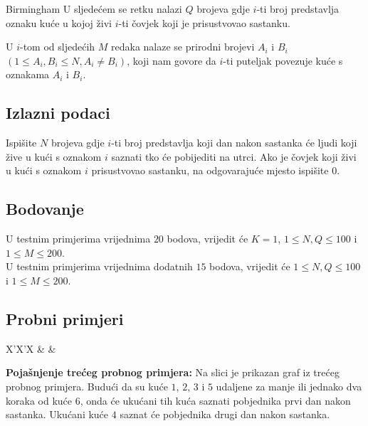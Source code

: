 \begin{statement}[
  problempoints=70,
  timelimit=1 sekunda,
  memorylimit=512 MiB,
]{Birmingham}
U sljedećem se retku nalazi $Q$ brojeva gdje $i$-ti broj predstavlja oznaku
kuće u kojoj živi $i$-ti čovjek koji je prisustvovao sastanku.

U $i$-tom od sljedećih $M$ redaka nalaze se prirodni brojevi $A_i$ i $B_i$ $(1
\le A_i, B_i \le N, A_i \neq B_i)$, koji nam govore da $i$-ti puteljak
povezuje kuće s oznakama $A_i$ i $B_i$.

\subsection*{Izlazni podaci}
Ispišite $N$ brojeva gdje $i$-ti broj predstavlja koji dan nakon sastanka će
ljudi koji žive u kući s oznakom $i$ saznati tko će pobijediti na utrci. Ako
je čovjek koji živi u kući s oznakom $i$ prisustvovao sastanku, na
odgovarajuće mjesto ispišite $0$.

\subsection*{Bodovanje}
U testnim primjerima vrijednima $20$ bodova, vrijedit će $K=1$, $1 \le N, Q
\le 100$ i $1 \le M \le 200$.\\
U testnim primjerima vrijednima dodatnih $15$ bodova, vrijedit će $1 \le N, Q
\le 100$ i $1 \le M \le 200$.

\subsection*{Probni primjeri}
\begin{tabularx}{\textwidth}{X'X'X}
 &
 &
\end{tabularx}

\textbf{Pojašnjenje trećeg probnog primjera:}
Na slici je prikazan graf iz trećeg probnog primjera. Budući da su kuće $1$,
$2$, $3$ i $5$ udaljene za manje ili jednako dva koraka od kuće $6$, onda će
ukućani tih kuća saznati pobjednika prvi dan nakon sastanka. Ukućani kuće $4$
saznat će pobjednika drugi dan nakon sastanka.


\end{statement}

